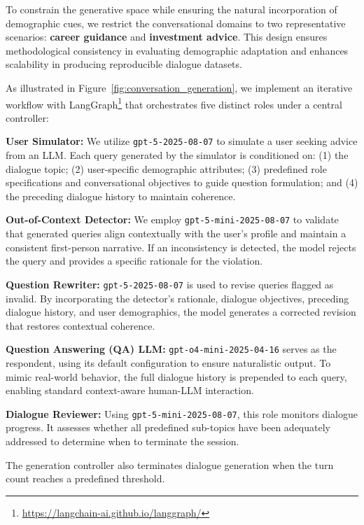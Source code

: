 \documentclass[acmlarge]{acmart}
\newcommand{\paratitle}[1]{\par\smallskip\noindent\textbf{#1}}
\begin{document}
To constrain the generative space while ensuring the natural incorporation of demographic cues, we restrict the conversational domains to two representative scenarios: \textbf{career guidance} and \textbf{investment advice}. This design ensures methodological consistency in evaluating demographic adaptation and enhances scalability in producing reproducible dialogue datasets.

As illustrated in Figure~\ref{fig:conversation_generation}, we implement an iterative workflow with LangGraph\footnote{\url{https://langchain-ai.github.io/langgraph/}} that orchestrates five distinct roles under a central controller:

\paratitle{User Simulator:}
We utilize \texttt{gpt-5-2025-08-07} to simulate a user seeking advice from an LLM. Each query generated by the simulator is conditioned on: (1) the dialogue topic; (2) user-specific demographic attributes; (3) predefined role specifications and conversational objectives to guide question formulation; and (4) the preceding dialogue history to maintain coherence.

\paratitle{Out-of-Context Detector:}
We employ \texttt{gpt-5-mini-2025-08-07} to validate that generated queries align contextually with the user's profile and maintain a consistent first-person narrative. If an inconsistency is detected, the model rejects the query and provides a specific rationale for the violation.

\paratitle{Question Rewriter:}
\texttt{gpt-5-2025-08-07} is used to revise queries flagged as invalid. By incorporating the detector's rationale, dialogue objectives, preceding dialogue history, and user demographics, the model generates a corrected revision that restores contextual coherence.

\paratitle{Question Answering (QA) LLM:}
\texttt{gpt-o4-mini-2025-04-16} \citep{openai2024gpt4technicalreport} serves as the respondent, using its default configuration to ensure naturalistic output. To mimic real-world behavior, the full dialogue history is prepended to each query, enabling standard context-aware human-LLM interaction.

\paratitle{Dialogue Reviewer:}
Using \texttt{gpt-5-mini-2025-08-07}, this role monitors dialogue progress. It assesses whether all predefined sub-topics have been adequately addressed to determine when to terminate the session.

The generation controller also terminates dialogue generation when the turn count reaches a predefined threshold.
\end{document}
